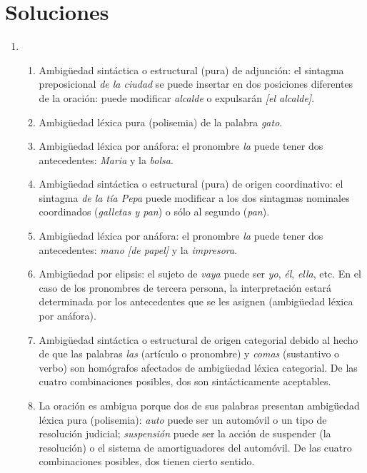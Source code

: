 \section{Soluciones} 

\begin{enumerate} \item \begin{enumerate} \item Ambigüedad sintáctica o estructural (pura) de adjunción: el sintagma preposicional \emph{de la ciudad} se puede insertar en dos posiciones diferentes de la oración: puede modificar \emph{alcalde} o expulsarán \emph{[el alcalde]}. \item Ambigüedad léxica pura (polisemia) de la palabra \emph{gato}. \item Ambigüedad léxica por anáfora: el pronombre \emph{la} puede tener dos antecedentes: \emph{Maria} y la \emph{bolsa}. \item Ambigüedad sintáctica o estructural (pura) de origen coordinativo: el sintagma \emph{de la tía Pepa} puede modificar a los dos sintagmas nominales coordinados (\emph{galletas y pan}) o sólo al segundo (\emph{pan}). \item Ambigüedad léxica por anáfora: el pronombre \emph{la} puede tener dos antecedentes: \emph{mano [de papel]} y la \emph{impresora}. \item Ambigüedad por elipsis: el sujeto de \emph{vaya} puede ser \emph{yo}, \emph{él}, \emph{ella}, etc. En el caso de los pronombres de tercera persona, la interpretación estará determinada por los antecedentes que se les asignen (ambigüedad léxica por anáfora). \item Ambigüedad sintáctica o estructural de origen categorial debido al hecho de que las palabras \emph{las} (artículo o pronombre) y \emph{comas} (sustantivo o verbo) son homógrafos afectados de ambigüedad léxica categorial. De las cuatro combinaciones posibles, dos son sintácticamente aceptables. \item La oración es ambigua porque dos de sus palabras presentan ambigüedad léxica pura (polisemia): \emph{auto} puede ser un automóvil o un tipo de resolución judicial; \emph{suspensión} puede ser la acción de suspender (la resolución) o el sistema de amortiguadores del automóvil. De las cuatro combinaciones posibles, dos tienen cierto sentido. 


\end{enumerate}
\end{enumerate}
